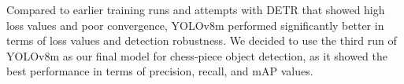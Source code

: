 \begin{table}[ht]
\centering
\caption{Final loss values for the dataset: Chess Piece Detection. All values are approximate and taken at convergence}
\label{tab:yolov8-loss}
\end{table}

Compared to earlier training runs and attempts with DETR that showed high loss values and poor convergence, YOLOv8m performed significantly better in terms of loss values and detection robustness.
We decided to use the third run of YOLOv8m as our final model for chess-piece object detection, as it showed the best performance in terms of precision, recall, and mAP values.